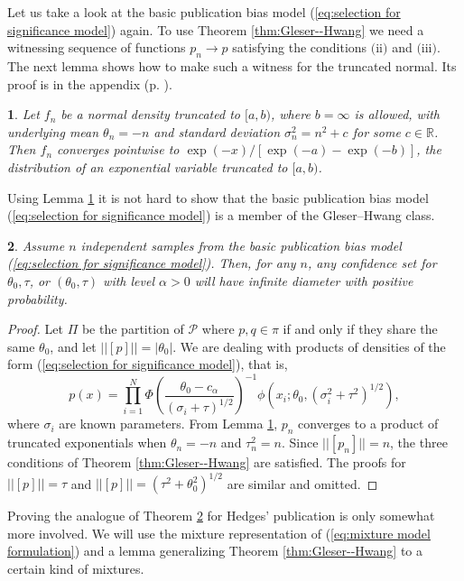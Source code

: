 \documentclass[article]{ajs}
\numberwithin{equation}{section}
\numberwithin{figure}{section}
\theoremstyle{plain}
\newtheorem{thm}{\protect\theoremname}
\theoremstyle{definition}
\theoremstyle{definition}
\theoremstyle{plain}
\newtheorem{lem}[thm]{\protect\lemmaname}
\providecommand{\lemmaname}{Lemma}
\providecommand{\theoremname}{Theorem}
\renewcommand{\sqrt}[1]{{(#1)^{1/2}}}
\begin{document}
Let us take a look at the basic publication bias model (\ref{eq:selection for significance model})
again. To use Theorem \ref{thm:Gleser--Hwang} we need a witnessing
sequence of functions $p_{n}\to p$ satisfying the conditions $\text{(ii)}$
and $\text{(iii)}$. The next lemma shows how to make such a witness
for the truncated normal. Its proof is in the appendix (p. \pageref{proof:generalized shifted exponential}).
\begin{lem}
\label{lem:generalized shifted exponential} Let $f_{n}$ be a normal
density truncated to $[a,b)$, where $b=\infty$ is allowed, with
underlying mean $\theta_{n}=-n$ and standard deviation $\sigma_{n}^{2}=n^{2}+c$
for some $c\in\mathbb{R}$. Then $f_{n}$ converges pointwise to $\exp(-x)/[\exp(-a)-\exp(-b)]$,
the distribution of an exponential variable truncated to $[a,b)$.
\end{lem}

Using Lemma \ref{lem:generalized shifted exponential} it is not hard
to show that the basic publication bias model (\ref{eq:selection for significance model})
is a member of the Gleser--Hwang class.
\begin{thm}
\label{thm:simple publication bias} Assume $n$ independent samples
from the basic publication bias model (\ref{eq:selection for significance model}).
Then, for any $n$, any confidence set for $\theta_{0},\tau$, or
$(\theta_{0},\tau)$ with level $\alpha>0$ will have infinite diameter
with positive probability. 
\end{thm}

\begin{proof}
\label{proof:simple publication bias}Let $\Pi$ be the partition
of $\mathcal{P}$ where $p,q\in\pi$ if and only if they share the
same $\theta_{0}$, and let $||[p]||=|\theta_{0}|$. We are dealing
with products of densities of the form (\ref{eq:selection for significance model}),
that is,
\[
p(x)=\prod_{i=1}^{N}\Phi\left(\frac{\theta_{0}-c_{\alpha}}{\sqrt{\sigma_{i}+\tau}}\right)^{-1}\phi(x_{i};\theta_{0},\sqrt{\sigma_{i}^{2}+\tau^{2}}),
\]
where $\sigma_{i}$ are known parameters. From Lemma \ref{lem:generalized shifted exponential},
$p_{n}$ converges to a product of truncated exponentials when $\theta_{n}=-n$
and $\tau_{n}^{2}=n$. Since $||[p_{n}]||=n$, the three conditions
of Theorem \ref{thm:Gleser--Hwang} are satisfied. The proofs for
$||[p]||=\tau$ and $||[p]||=\sqrt{\tau^{2}+\theta_{0}^{2}}$ are
similar and omitted.
\end{proof}
Proving the analogue of Theorem \ref{thm:simple publication bias}
for Hedges' publication is only somewhat more involved. We will use
the mixture representation of (\ref{eq:mixture model formulation})
and a lemma generalizing Theorem \ref{thm:Gleser--Hwang} to a certain
kind of mixtures. 
\end{document}
